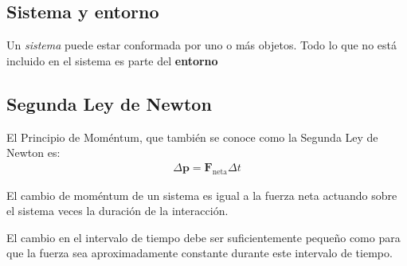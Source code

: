 \subsection{Sistema y entorno}

Un \emph{sistema} puede estar conformada por uno o más objetos. Todo lo que no está incluido en el sistema es parte del \textbf{entorno}



\subsection{Segunda Ley de Newton}

\begin{frame}
{El Principio de Moméntum}, que también se conoce como la Segunda Ley de Newton es:
\begin{align}
  \Delta\mathbf{p}=\mathbf{F}_{\text{neta}}\Delta t
\end{align}
\end{frame}

El cambio de moméntum de un sistema es igual a la fuerza neta actuando sobre el sistema veces la duración de la interacción. 

El cambio en el intervalo de tiempo debe ser suficientemente pequeño como para que la fuerza sea aproximadamente constante durante este intervalo de tiempo.

